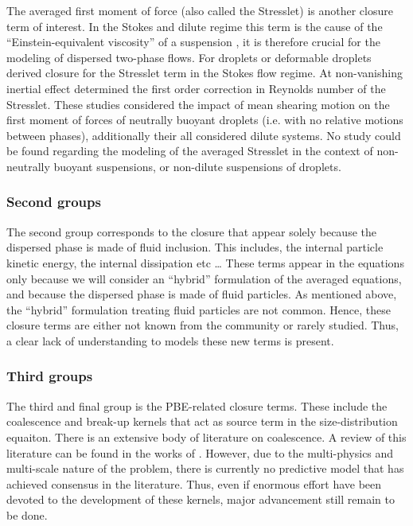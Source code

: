 The averaged first moment of force (also called the Stresslet) is another closure term of interest.
In the Stokes and dilute regime this term is the cause of the ``Einstein-equivalent viscosity''  of a suspension \citep{guazzelli2011}, it is therefore crucial for the modeling of dispersed two-phase flows. 
For droplets or deformable droplets \citet{nadim1996concise} derived closure for the Stresslet term in the Stokes flow regime.  
At non-vanishing inertial effect \citet{raja2010inertial} determined the first order correction in Reynolds number of the Stresslet. 
These studies considered the impact of mean shearing motion on the first moment of forces of neutrally buoyant droplets (i.e. with no relative motions between phases), additionally their all considered dilute systems. 
No study could be found regarding the modeling of the averaged Stresslet in the context of non-neutrally buoyant suspensions, or non-dilute suspensions of droplets. 

\subsubsection{Second groups}


The second group corresponds to the closure that appear solely because the dispersed phase is made of fluid inclusion. 
This includes, the internal particle kinetic energy, the internal dissipation etc \ldots
These terms appear in the equations only because we will consider an ``hybrid'' formulation of the averaged equations, and because the dispersed phase is made of fluid particles. 
As mentioned above, the ``hybrid'' formulation treating fluid particles are not common. 
Hence, these closure terms are either not known from the community or rarely studied. 
Thus, a clear lack of understanding to models these new terms is present.  

\subsubsection{Third groups}

The third and final group is the PBE-related closure terms. 
These include the coalescence and break-up kernels that act as source term in the size-distribution equaiton. 
There is an extensive body of literature on coalescence. 
A review of this literature can be found in the works of \citet{chesters1991modelling}. 
However, due to the multi-physics and multi-scale nature of the problem, there is currently no predictive model that has achieved consensus in the literature. 
Thus, even if enormous effort have been devoted to the development of these kernels, major advancement still remain to be done. 



